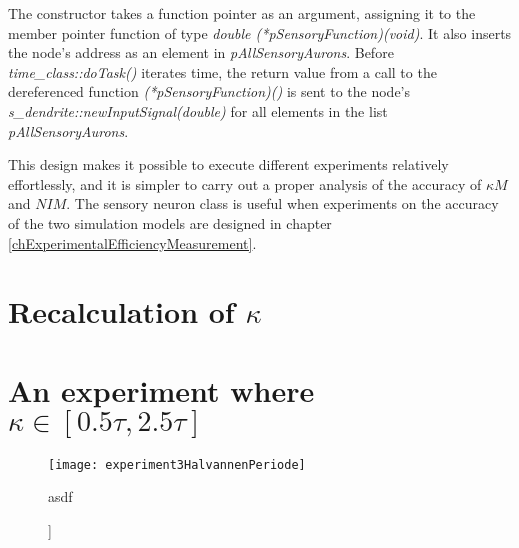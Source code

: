 			The constructor takes a function pointer as an argument, assigning it to the member pointer function of type \emph{double (*pSensoryFunction)(void)}. 
			It also inserts the node's address as an element in \emph{pAllSensoryAurons}.
			Before \emph{time\_class::doTask()} iterates time, the return value from a call to the dereferenced function \emph{(*pSensoryFunction)()} 
				is sent to the node's \emph{s\_dendrite::newInputSignal(double)} for all elements in the list \emph{pAllSensoryAurons}.

			This design makes it possible to execute different experiments relatively effortlessly, and it is simpler to carry out a proper analysis of the accuracy of $\kappa M$ and $NIM$.
			The sensory neuron class is useful when experiments on the accuracy of the two simulation models are designed in chapter \ref{chExperimentalEfficiencyMeasurement}.
			
		\section{Recalculation of $\kappa$}

	\section{An experiment where $\kappa \in [0.5\tau, 2.5\tau]$}
		\label{appendixExperiment3}
		\begin{figure}[hbt!p]
			\centerline{ \texttt{[image: experiment3HalvannenPeriode]} }
			\caption[Experiment 3, sensory function $f(t)\in [0.5\tau, 2.5\tau$]]{asdf}
		\end{figure}

